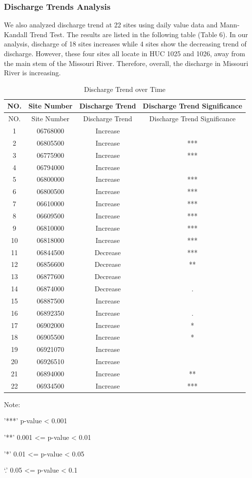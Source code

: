 \documentclass[12pt,]{article}
\begin{document}
\hypertarget{discharge-trends-analysis}{%
\subsubsection{Discharge Trends
Analysis}\label{discharge-trends-analysis}}

We also analyzed discharge trend at 22 sites using daily value data and
Mann-Kandall Trend Test. The results are listed in the following table
(Table 6). In our analysis, discharge of 18 sites increases while 4
sites show the decreasing trend of discharge. However, these four sites
all locate in HUC 1025 and 1026, away from the main stem of the Missouri
River. Therefore, overall, the discharge in Missouri River is
increasing.

\newpage

\begin{longtable}[]{@{}cccc@{}}
\caption{Discharge Trend over Time}\tabularnewline
\toprule
NO. & Site Number & Discharge Trend & Discharge Trend
Significance\tabularnewline
\midrule
\endfirsthead
\toprule
NO. & Site Number & Discharge Trend & Discharge Trend
Significance\tabularnewline
\midrule
\endhead
1 & 06768000 & Increase &\tabularnewline
2 & 06805500 & Increase & ***\tabularnewline
3 & 06775900 & Increase & ***\tabularnewline
4 & 06794000 & Increase &\tabularnewline
5 & 06800000 & Increase & ***\tabularnewline
6 & 06800500 & Increase & ***\tabularnewline
7 & 06610000 & Increase & ***\tabularnewline
8 & 06609500 & Increase & ***\tabularnewline
9 & 06810000 & Increase & ***\tabularnewline
10 & 06818000 & Increase & ***\tabularnewline
11 & 06844500 & Decrease & ***\tabularnewline
12 & 06856600 & Decrease & **\tabularnewline
13 & 06877600 & Decrease &\tabularnewline
14 & 06874000 & Decrease & .\tabularnewline
15 & 06887500 & Increase &\tabularnewline
16 & 06892350 & Increase & .\tabularnewline
17 & 06902000 & Increase & *\tabularnewline
18 & 06905500 & Increase & *\tabularnewline
19 & 06921070 & Increase &\tabularnewline
20 & 06926510 & Increase &\tabularnewline
21 & 06894000 & Increase & **\tabularnewline
22 & 06934500 & Increase & ***\tabularnewline
\bottomrule
\end{longtable}

Note:

'***' p-value \textless{} 0.001

'**' 0.001 \textless{}= p-value \textless{} 0.01

'*' 0.01 \textless{}= p-value \textless{} 0.05

`.' 0.05 \textless{}= p-value \textless{} 0.1
\end{document}
